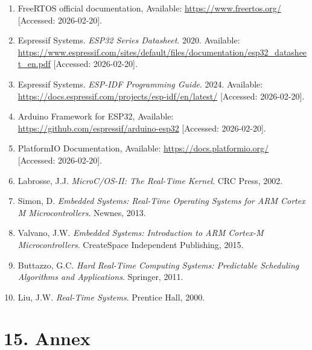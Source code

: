 \documentclass[12pt]{article}
\begin{document}
\begin{enumerate}
    \item FreeRTOS official documentation, Available: \url{https://www.freertos.org/} [Accessed: 2026-02-20].
    
    \item Espressif Systems. \textit{ESP32 Series Datasheet}. 2020. Available: \url{https://www.espressif.com/sites/default/files/documentation/esp32\_datasheet\_en.pdf} [Accessed: 2026-02-20].
    
    \item Espressif Systems. \textit{ESP-IDF Programming Guide}. 2024. Available: \url{https://docs.espressif.com/projects/esp-idf/en/latest/} [Accessed: 2026-02-20].
    
    \item Arduino Framework for ESP32, Available: \url{https://github.com/espressif/arduino-esp32} [Accessed: 2026-02-20].
    
    \item PlatformIO Documentation, Available: \url{https://docs.platformio.org/} [Accessed: 2026-02-20].
    
    \item Labrosse, J.J. \textit{MicroC/OS-II: The Real-Time Kernel}. CRC Press, 2002.
    
    \item Simon, D. \textit{Embedded Systems: Real-Time Operating Systems for ARM Cortex M Microcontrollers}. Newnes, 2013.
    
    \item Valvano, J.W. \textit{Embedded Systems: Introduction to ARM Cortex-M Microcontrollers}. CreateSpace Independent Publishing, 2015.
    
    \item Buttazzo, G.C. \textit{Hard Real-Time Computing Systems: Predictable Scheduling Algorithms and Applications}. Springer, 2011.
    
    \item Liu, J.W. \textit{Real-Time Systems}. Prentice Hall, 2000.
\end{enumerate}

\section*{15. Annex}
\end{document}
